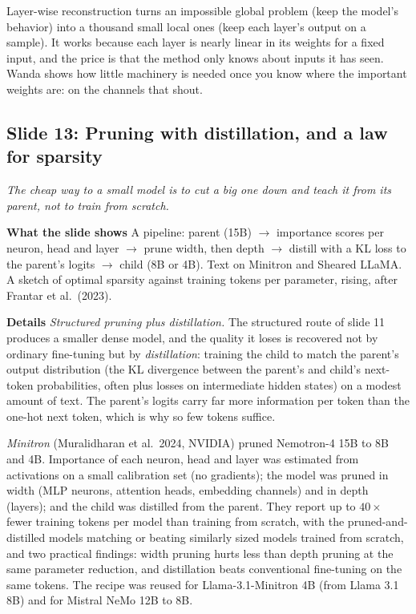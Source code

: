 \documentclass[11pt,letterpaper]{article}
\newcommand{\slide}[3]{%
  \subsection[Slide #1: #2]{Slide #1: #2}%
  {\color{muted}\itshape #3\par}\medskip}
\newcommand{\para}[1]{\medskip\noindent\textbf{#1}\quad}
\newenvironment{intuition}{\begin{tcolorbox}[intuitionbox]}{\end{tcolorbox}}
\begin{document}
\begin{intuition}
Layer-wise reconstruction turns an impossible global problem (keep the model's behavior) into a thousand small local ones (keep each layer's output on a sample). It works because each layer is nearly linear in its weights for a fixed input, and the price is that the method only knows about inputs it has seen. Wanda shows how little machinery is needed once you know where the important weights are: on the channels that shout.
\end{intuition}

\slide{13}{Pruning with distillation, and a law for sparsity}{The cheap way to a small model is to cut a big one down and teach it from its parent, not to train from scratch.}

\para{What the slide shows} A pipeline: parent (15B) $\to$ importance scores per neuron, head and layer $\to$ prune width, then depth $\to$ distill with a KL loss to the parent's logits $\to$ child (8B or 4B). Text on Minitron and Sheared LLaMA. A sketch of optimal sparsity against training tokens per parameter, rising, after Frantar et al.\ (2023).

\para{Details} \emph{Structured pruning plus distillation.} The structured route of slide 11 produces a smaller dense model, and the quality it loses is recovered not by ordinary fine-tuning but by \emph{distillation}: training the child to match the parent's output distribution (the KL divergence between the parent's and child's next-token probabilities, often plus losses on intermediate hidden states) on a modest amount of text. The parent's logits carry far more information per token than the one-hot next token, which is why so few tokens suffice.

\emph{Minitron} (Muralidharan et al.\ 2024, NVIDIA) pruned Nemotron-4 15B to 8B and 4B. Importance of each neuron, head and layer was estimated from activations on a small calibration set (no gradients); the model was pruned in width (MLP neurons, attention heads, embedding channels) and in depth (layers); and the child was distilled from the parent. They report up to $40\times$ fewer training tokens per model than training from scratch, with the pruned-and-distilled models matching or beating similarly sized models trained from scratch, and two practical findings: width pruning hurts less than depth pruning at the same parameter reduction, and distillation beats conventional fine-tuning on the same tokens. The recipe was reused for Llama-3.1-Minitron 4B (from Llama 3.1 8B) and for Mistral NeMo 12B to 8B.
\end{document}
